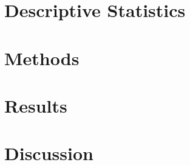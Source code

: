 \documentclass{article}
\begin{document}
\section{Descriptive Statistics}
\section{Methods}
\section{Results}
\section{Discussion}
\end{document}
